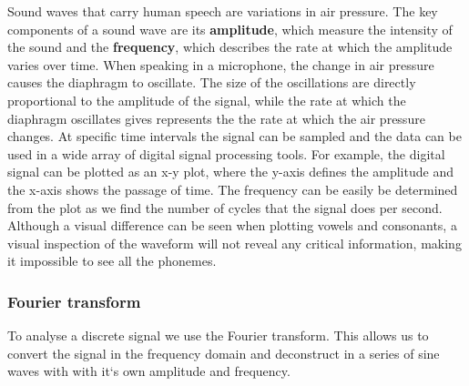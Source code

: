 Sound waves that carry human speech are variations in air pressure. The key components of a sound wave are its \textbf{amplitude}, which measure the intensity of the sound and the \textbf{frequency}, which describes the rate at which the amplitude varies over time. When speaking in a microphone, the change in air pressure causes the diaphragm to oscillate. The size of the oscillations are directly proportional to the amplitude of the signal, while the rate at which the diaphragm oscillates gives represents the the rate at which the air pressure changes. At specific time intervals the signal can be sampled and the data can be used in a wide array of digital signal processing tools. For example, the digital signal can be plotted as an x-y plot, where the y-axis defines the amplitude and the x-axis shows the passage of time. The frequency can be easily be determined from the plot as we find the number of cycles that the signal does per second.\\

Although a visual difference can be seen when plotting vowels and consonants, a visual inspection of the waveform will not reveal any critical information, making it impossible to see all the phonemes.\\

\subsubsection{ Fourier transform}

To analyse a discrete signal we use the Fourier transform. This allows us to convert the signal in the frequency domain and deconstruct in a series of sine waves with with it`s own amplitude and frequency.